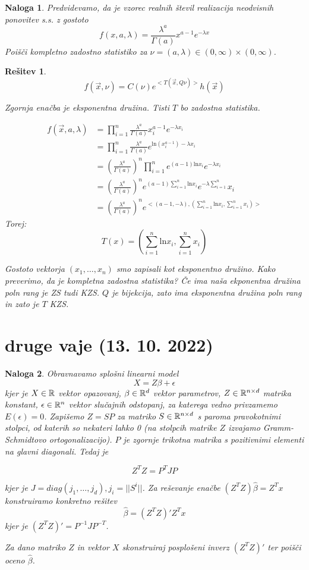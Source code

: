 \documentclass{homework}
\newtheorem{exercise}{Naloga}
\newtheorem{solution}{Rešitev}
\begin{document}
\begin{exercise}
  Predvidevamo, da je vzorec realnih števil realizacija neodvisnih ponovitev s.s. z gostoto
  $$ f(x, a, \lambda) = \frac{\lambda^a}{\Gamma(a)}x^{a-1}e^{-\lambda x}$$
  Poišči kompletno zadostno statistiko za $\nu = (a, \lambda)\in (0, \infty) \times (0, \infty)$.
\end{exercise}

\begin{solution}
  

$$f(\vec{x}, \nu) = C(\nu) e^{< T(\vec{x}, Q{\nu})>}h(\vec{x})$$

Zgornja enačba je eksponentna družina. Tisti $T$ bo zadostna statistika.

\begin{align*}
  f(\vec{x}, a, \lambda) & = \prod_{i=1}^n \frac{\lambda^a}{\Gamma(a)}x_i^{a-1}e^{-\lambda x_i}\\
   & = \prod_{i=1}^n \frac{\lambda^a}{\Gamma(a)} e^{\text{ln}(x^{a-1}_i)-\lambda x_i} \\
   & = (\frac{\lambda^a}{\Gamma(a)})^n \prod_{i=1}^n e^{(a-1)\text{ln}x_i}e^{-\lambda x_i}\\
   & = (\frac{\lambda^a}{\Gamma(a)})^n e^{(a-1)\sum_{i=1}^n \text{ln}x_i}e^{-\lambda \sum_{i = 1}^n}x_i \\
   & = (\frac{\lambda^a}{\Gamma(a)})^n e^{<(a-1, -\lambda), (\sum_{i=1}^n \text{ln}x_i, \sum_{i=1}^n x_i)>}
\end{align*}
Torej: 
$$T(x) = (\sum_{i=1}^n \text{ln}x_i, \sum_{i=1}^n x_i)$$

Gostoto vektorja $(x_1, \dots, x_n)$ smo zapisali kot eksponentno družino. Kako preverimo, da je kompletna zadostna statistika?
Če ima naša ekponentna družina poln rang je ZS tudi KZS. $Q$ je bijekcija, zato ima eksponentna družina poln rang in zato je $T$ KZS.
\end{solution}

\pagebreak

\section{druge vaje (13. 10. 2022)}

\begin{exercise}
Obravnavamo splošni linearni model
$$ X = Z \beta + \epsilon$$
kjer je $X \in \mathbb{R}$ vektor opazovanj, $\beta \in \mathbb{R}^d$ vektor parametrov, $Z \in \mathbb{R}^{n \times d}$ matrika konstant,
$\epsilon \in \mathbb{R}^n$ vektor slučajnih odstopanj, za katerega vedno privzamemo $E(\epsilon) = 0$.
Zapišemo $Z = SP$ za matriko $S \in \mathbb{R}^{n\times d}$ s paroma pravokotnimi stolpci, od katerih so nekateri lahko 0 (na stolpcih matrike $Z$ izvajamo Gramm-Schmidtovo ortogonalizacijo).
$P$ je zgornje trikotna matrika s pozitivnimi elementi na glavni diagonali. Tedaj je

$$Z^T Z = P^T JP $$

kjer je $J = diag(j_1, \dots, j_d), j_i = ||S^i||$. Za reševanje enačbe $(Z^TZ)\hat{\beta} = Z^Tx$ konstruiramo konkretno rešitev 
$$\hat{\beta} = (Z^TZ)'Z^Tx$$ kjer je $(Z^TZ)' = P^{-1}JP^{-T}$.

Za dano matriko $Z$ in vektor $X$ skonstruiraj posplošeni inverz $(Z^TZ)'$ ter poišči oceno $\hat{\beta}$.
\end{exercise}
\end{document}
